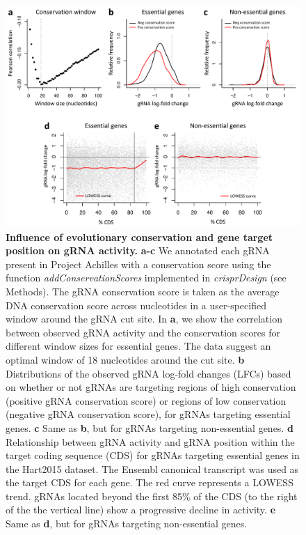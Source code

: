 \documentclass[pdftex,english,10pt]{article}
\begin{document}
{%
\begin{figure}[!h]
\centering
\includegraphics[width=1\textwidth]{figures/cons/cons.pdf}
  \caption{\textbf{Influence of evolutionary conservation and gene target position on gRNA activity.} 
\textbf{a-c} We annotated each gRNA present in Project Achilles with a conservation score using the function \textit{addConservationScores} implemented in \textit{crisprDesign} (see Methods). The gRNA conservation score is taken as the average DNA conservation score across nucleotides in a user-specified window around the gRNA cut site. In \textbf{a}, we show the correlation between observed gRNA activity and the conservation scores for different window sizes for essential genes. The data suggest an optimal window of 18 nucleotides around the cut site. \textbf{b} Distributions of the observed gRNA log-fold changes (LFCs) based on whether or not gRNAs are targeting regions of high conservation (positive gRNA conservation score) or regions of low conservation (negative gRNA conservation score), for gRNAs targeting essential genes. \textbf{c} Same as \textbf{b}, but for gRNAs targeting non-essential genes. \textbf{d} Relationship between gRNA activity and gRNA position within the target coding sequence (CDS) for gRNAs targeting essential genes in the Hart2015 dataset.  The Ensembl canonical transcript was used as the target CDS for each gene. The red curve represents a LOWESS trend. gRNAs located beyond the first 85\% of the CDS (to the right of the the vertical line) show a progressive decline in activity. \textbf{e} Same as \textbf{d}, but for gRNAs targeting non-essential genes. 
  }
  \label{suppfig:cons}
\end{figure}





}
\end{document}
